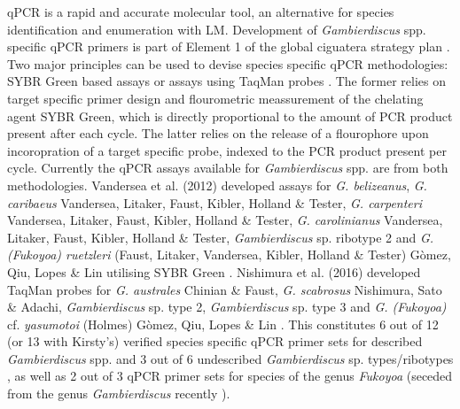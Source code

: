 \documentclass[12pt]{article}
\begin{document}
qPCR is a rapid and accurate molecular tool, an alternative for species identification and enumeration with LM. Development of \emph{Gambierdiscus} spp. specific qPCR primers is part of Element 1 of the global ciguatera strategy plan \citep{globalcig}. Two major principles can be used to devise species specific qPCR methodologies: SYBR Green based assays or assays using TaqMan probes \citep{smith2009advantages}. The former relies on target specific primer design and flourometric meassurement of the chelating agent SYBR Green, which is directly proportional to the amount of PCR product present after each cycle. The latter relies on the release of a flourophore upon incoropration of a target specific probe, indexed to the PCR product present per cycle. Currently the qPCR assays available for \emph{Gambierdiscus} spp. are from both methodologies. Vandersea et al. (2012) developed assays for \emph{G. belizeanus}, \emph{G. caribaeus} Vandersea, Litaker, Faust, Kibler, Holland \& Tester, \emph{G. carpenteri} Vandersea, Litaker, Faust, Kibler, Holland \& Tester, \emph{G. carolinianus} Vandersea, Litaker, Faust, Kibler, Holland \& Tester, \emph{Gambierdiscus} sp. ribotype 2 and \emph{G. (Fukoyoa) ruetzleri} (Faust, Litaker, Vandersea, Kibler, Holland \& Tester) G\`omez, Qiu, Lopes \& Lin utilising SYBR Green \citep{vandersea2012development}. Nishimura et al. (2016) developed TaqMan probes for \emph{G. australes} Chinian \& Faust, \emph{G. scabrosus} Nishimura, Sato \& Adachi, \emph{Gambierdiscus} sp. type 2, \emph{Gambierdiscus} sp. type 3 and \emph{G. (Fukoyoa)} cf. \emph{yasumotoi} (Holmes) G\`omez, Qiu, Lopes \& Lin \citep{nishimura2016quantitative}. This constitutes 6 out of 12 (or 13 with Kirsty's) verified species specific qPCR primer sets for described \emph{Gambierdiscus} spp. and 3 out of 6 undescribed \emph{Gambierdiscus} sp. types/ribotypes , as well as 2 out of 3 qPCR primer sets for species of the genus \emph{Fukoyoa} (seceded from the genus \emph{Gambierdiscus} recently \citep{gomez2015fukuyoa}). \\
\end{document}
